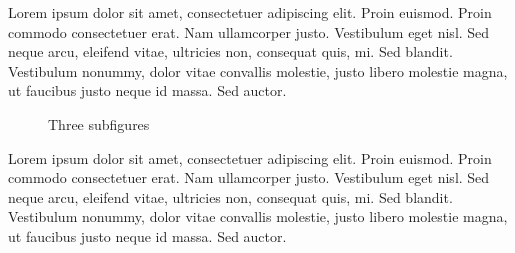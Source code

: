 \documentclass{article}
\begin{document}
Lorem ipsum dolor sit amet, consectetuer adipiscing elit. Proin euismod.
Proin commodo consectetuer erat. Nam ullamcorper justo. Vestibulum eget
nisl. Sed neque arcu, eleifend vitae, ultricies non, consequat quis, mi.
Sed blandit. Vestibulum nonummy, dolor vitae convallis molestie, justo
libero molestie magna, ut faucibus justo neque id massa. Sed auctor.

\begin{figure}[h]
\begin{center}
\quad
{}\quad
{}
\end{center}
\caption{Three subfigures}
\end{figure} 

Lorem ipsum dolor sit amet, consectetuer adipiscing elit. Proin euismod.
Proin commodo consectetuer erat. Nam ullamcorper justo. Vestibulum eget
nisl. Sed neque arcu, eleifend vitae, ultricies non, consequat quis, mi.
Sed blandit. Vestibulum nonummy, dolor vitae convallis molestie, justo
libero molestie magna, ut faucibus justo neque id massa. Sed auctor.
\end{document}
